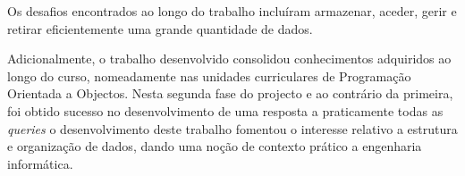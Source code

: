 \documentclass{article}
\begin{document}
Os desafios encontrados ao longo do trabalho incluíram armazenar, aceder, gerir e retirar eficientemente uma grande quantidade de dados.

Adicionalmente, o trabalho desenvolvido consolidou conhecimentos adquiridos ao longo do curso, nomeadamente nas unidades curriculares de Programação Orientada a Objectos.
Nesta segunda fase do projecto e ao contrário da primeira, foi obtido sucesso no desenvolvimento de uma resposta a praticamente todas as \textit{queries} o desenvolvimento deste trabalho fomentou o interesse relativo a estrutura e organização de dados, dando uma noção de contexto prático a engenharia informática.


~\nocite{F.MarioMartins2014}
~\nocite{MarioMartins2009}
\newpage
\renewcommand\refname{Bibliografia}


\end{document}
